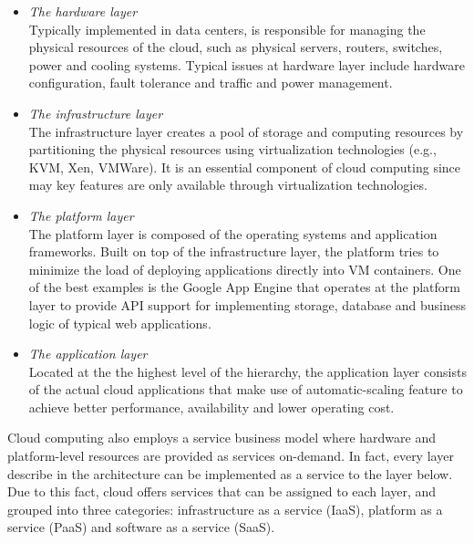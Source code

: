 \begin{itemize}
\item \textit{The hardware layer}\\
Typically implemented in data centers, is responsible for managing the physical resources of the cloud, such as physical servers, routers, switches, power and cooling systems. Typical issues at hardware layer include hardware configuration, fault tolerance and traffic and power management.\cite{cloud:SS}\\

\item \textit{The infrastructure layer}\\
The infrastructure layer creates a pool of storage and computing resources by partitioning the physical resources using virtualization technologies (e.g., KVM, Xen, VMWare). It is an essential component of cloud computing since may key features are only available through virtualization technologies.\cite{cloud:SS} \\

\item \textit{The platform layer}\\
The platform layer is composed of the operating systems and application frameworks. Built on top of the infrastructure layer, the platform tries to minimize the load of deploying applications directly into VM containers. One of the best examples is the Google App Engine that operates at the platform layer to provide API support for implementing storage, database and business logic of typical web applications.\cite{cloud:SS}\\

\item \textit{The application layer}\\
Located at the the highest level of the hierarchy, the application layer consists of the actual cloud applications that make use of automatic-scaling feature to achieve better performance, availability and lower operating cost.\cite{cloud:SS}
\end{itemize}

Cloud computing also employs a service business model where hardware and platform-level resources are provided as services on-demand. In fact, every layer describe in the architecture can be implemented as a service to the layer below. Due to this fact, cloud offers services  that can be assigned to each layer, and grouped into three categories: infrastructure as a service (IaaS), platform as a service (PaaS) and software as a service (SaaS).


